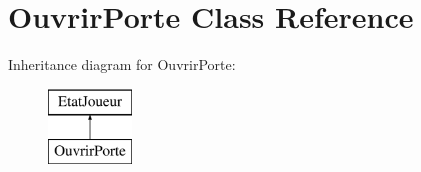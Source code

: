 \hypertarget{class_ouvrir_porte}{\section{Ouvrir\-Porte Class Reference}
\label{class_ouvrir_porte}
}
Inheritance diagram for Ouvrir\-Porte\-:\begin{figure}[H]
\begin{center}
\leavevmode
\includegraphics[height=2.000000cm]{class_ouvrir_porte}
\end{center}
\end{figure}
